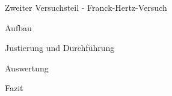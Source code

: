 \documentclass[pdftex, a4paper,11pt, twoside, ngerman]{report}
\begin{document}
 
 
  \begin{chapter}{Zweiter Versuchsteil - Franck-Hertz-Versuch}
    \label{chp:Balmer}
 
 
    \begin{section}{Aufbau}
      \label{chp:Balmer:sec:Aufbau}
      
      
      
    \end{section}
   
   
   
    \begin{section}{Justierung und Durchführung}
      \label{chp:Balmer:sec:JusitierungDurchfuehrung}
     
     
    
    \end{section}


    

    \begin{section}{Auswertung}
      \label{chp:Balmer:sec:Auswertung}
      
      
     
    \end{section}
   
   
   
    \begin{section}{Fazit}
      \label{chp:Balmer:sec:Fazit}
      
      
      
    \end{section}
   
  \end{chapter}
  
  
  
  
  
  
  
  \begin{thebibliography}{99}
    \scriptsize
    
   
  \end{thebibliography}
 
\end{document}
